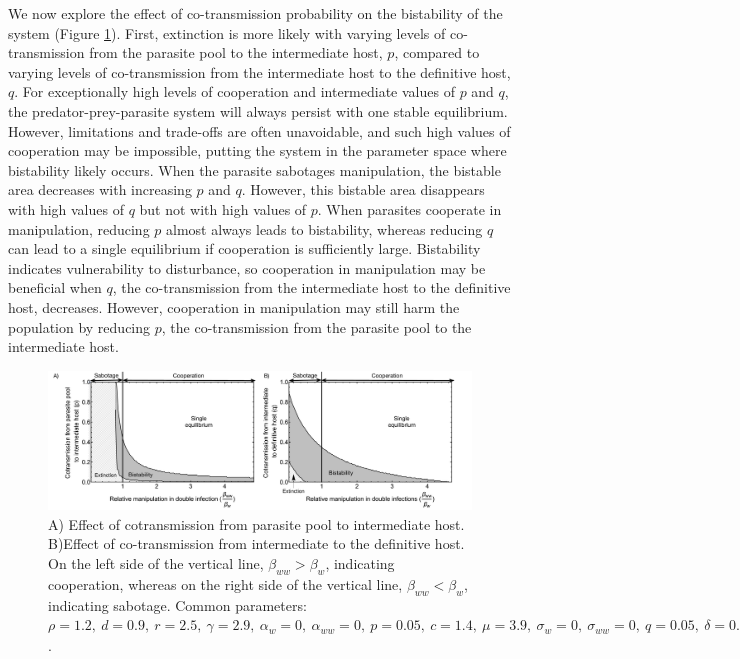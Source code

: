 \documentclass[a4paper]{scrartcl}
\begin{document}
We now explore the effect of co-transmission probability on the bistability of the system (Figure \ref{fig:contransmission}). 
First, extinction is more likely with varying levels of co-transmission from the parasite pool to the intermediate host, $p$, compared to varying levels of co-transmission from the intermediate host to the definitive host, $q$. 
For exceptionally high levels of cooperation and intermediate values of $p$ and $q$, the predator-prey-parasite system will always persist with one stable equilibrium.
However, limitations and trade-offs are often unavoidable, and such high values of cooperation may be impossible, putting the system in the parameter space where bistability likely occurs.
When the parasite sabotages manipulation, the bistable area decreases with increasing $p$ and $q$. 
However, this bistable area disappears with high values of $q$ but not with high values of $p$. 
When parasites cooperate in manipulation, reducing $p$ almost always leads to bistability, whereas reducing $q$ can lead to a single equilibrium if cooperation is sufficiently large.  
Bistability indicates vulnerability to disturbance, so cooperation in manipulation may be beneficial when $q$, the co-transmission from the intermediate host to the definitive host, decreases. 
However, cooperation in manipulation may still harm the population by reducing $p$, the co-transmission from the parasite pool to the intermediate host.

\begin{figure}[!ht]
	\captionsetup{format=plain}
	\centering
	\includegraphics[width=\textwidth]{coinfect_transmission.pdf}
	\caption{A) Effect of cotransmission from parasite pool to intermediate host. B)Effect of co-transmission from intermediate to the definitive host. On the left side of the vertical line, $\beta_{ww} > \beta_{w}$, indicating cooperation, whereas on the right side of the vertical line, $\beta_{ww} < \beta_{w}$, indicating sabotage. Common parameters:  $\rho = 1.2, \ d = 0.9, \ r = 2.5, \ \gamma = 2.9, \ \alpha_w = 0, \ \alpha_{ww} = 0, \ p = 0.05, \ c = 1.4, \ \mu = 3.9, \ \sigma_w = 0, \ \sigma_{ww} = 0, \ q = 0.05, \ \delta = 0.9, \ k = 0.26, \ \epsilon = 4.5, \ \beta_w = 1.45, \ f_w = 38, \ h = 0.6$.}
	\label{fig:contransmission}
\end{figure}
\end{document}
